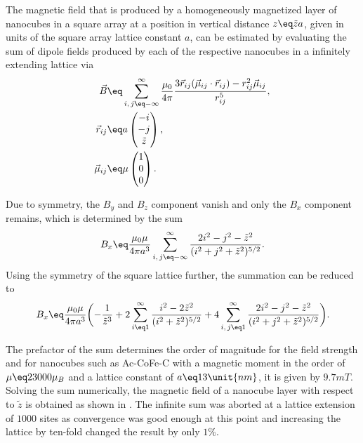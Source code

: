 \documentclass[\main/dresen_thesis.tex]{subfiles}
\begin{document}
  \label{sec:doublelayers:magnetism:intro}
  The magnetic field that is produced by a homogeneously magnetized layer of nanocubes in a square array at a position in vertical distance $z \eq \tilde{z} a$, given in units of the square array lattice constant $a$, can be estimated by evaluating the sum of dipole fields produced by each of the respective nanocubes in a infinitely extending lattice via
  \begin{align}
    \begin{split}
      \vec{B} \eq& \sum_{i,\, j \eq -\infty}^\infty \frac{\mu_0}{4 \pi} \frac{3 \vec{r}_{ij} (\vec{\mu}_{ij} \cdot \vec{r}_{ij}) - r_{ij}^2 \vec{\mu}_{ij}}{r_{ij}^5},\\
      \vec{r}_{ij} \eq& a \begin{pmatrix}-i\\-j\\\tilde{z}\end{pmatrix},\\
      \vec{\mu}_{ij} \eq& \mu \begin{pmatrix}1\\0\\0\end{pmatrix}.
    \end{split}
  \end{align}

  Due to symmetry, the $B_y$ and $B_z$ component vanish and only the $B_x$ component remains, which is determined by the sum
  \begin{align}
    B_x \eq& \frac{\mu_0 \mu}{4 \pi a^3} \sum_{i,\, j \eq -\infty}^\infty  \frac{2 i^2 - j^2 - \tilde{z}^2}{(i^2 + j^2 + \tilde{z}^2)^{5/2}}.\\
  \end{align}
  Using the symmetry of the square lattice further, the summation can be reduced to
  \begin{align}
    B_x \eq& \frac{\mu_0 \mu}{4 \pi a^3} \biggl( -\frac{1}{\tilde{z}^3} + 2 \sum_{i \eq 1}^\infty \frac{i^2 - 2\tilde{z}^2}{(i^2 + \tilde{z}^2)^{5/2}} + 4 \sum_{i,\, j \eq 1}^\infty  \frac{2 i^2 - j^2 - \tilde{z}^2}{(i^2 + j^2 + \tilde{z}^2)^{5/2}} \biggr).\\
  \end{align}

  The prefactor of the sum determines the order of magnitude for the field strength and for nanocubes such as Ac-CoFe-C with a magnetic moment in the order of $\mu \eq 23000 \mu_B$ and a lattice constant of $a \eq 13 \unit{nm}$, it is given by $9.7 \unit{mT}$.
  Solving the sum numerically, the magnetic field of a nanocube layer with respect to $\tilde{z}$ is obtained as shown in .
  The infinite sum was aborted at a lattice extension of $1000$ sites as convergence was good enough at this point and increasing the lattice by ten-fold changed the result by only $1\%$.
\end{document}
